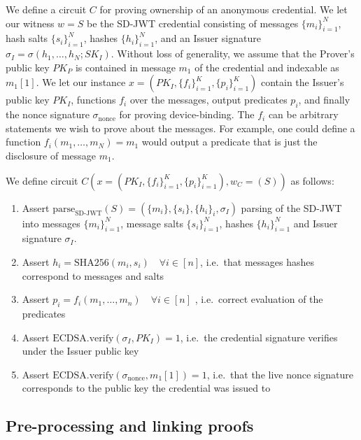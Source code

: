 We define a circuit $C$ for proving ownership of an anonymous credential. 
We let our witness $w = S$ be the SD-JWT credential consisting of messages $\{m_i\}_{i=1}^N$, hash salts $\{s_i\}_{i=1}^N$, 
hashes $\{h_i\}_{i=1}^N$, and an Issuer signature $\sigma_I = \sigma(h_1, \dots, h_N; SK_I)$. 
Without loss of generality, we assume that the Prover's public key $PK_P$ is contained in message $m_1$ of the credential and indexable as $m_1[1]$.
We let our instance $x = (PK_I, \{f_i\}_{i=1}^K, \{p_i\}_{i=1}^K)$ contain the Issuer's public key $PK_I$, functions $f_i$ over the messages, 
output predicates $p_i$, and finally the nonce signature $\sigma_{\text{nonce}}$ for proving device-binding. 
The $f_i$ can be arbitrary statements we wish to prove about the messages. For example, one could define a function $f_i(m_1, \dots, m_N) = m_1$ would output a predicate that is just the disclosure of message $m_1$.

\begin{mdframed}[style=zkprotocolwithheader, frametitle=Underlying ZK Circuit $C$ for Verifiable Credential]

We define circuit $C(x = (PK_I, \{f_i\}_{i=1}^K, \{p_i\}_{i=1}^K), w_C = (S))$ as follows:

\begin{enumerate}
\item Assert $\text{parse}_{\text{SD-JWT}}(S) = (\{m_i\}, \{s_i\}, \{h_i\}_i, \sigma_I)$ parsing of the SD-JWT into messages $\{m_i\}_{i=1}^N$, message salts $\{s_i\}_{i=1}^N$, hashes $\{h_i\}_{i=1}^N$ and Issuer signature $\sigma_I$.
\item Assert $h_i = \text{SHA256}(m_i, s_i) \quad \forall i \in [n]$, i.e.\ that messages hashes correspond to messages and salts
\item Assert $p_i = f_i(m_1, \dots, m_n) \quad \forall i \in [n]$ , i.e.\ correct evaluation of the predicates
\item Assert $\text{ECDSA.verify}(\sigma_I, PK_I) = 1$, i.e.\ the credential signature verifies under the Issuer public key
\item Assert $\text{ECDSA.verify}(\sigma_{\text{nonce}}, m_1[1]) = 1$, i.e.\ that the live nonce signature corresponds to the public key the credential was issued to
\end{enumerate}

\end{mdframed}

\subsection{Pre-processing and linking proofs}

